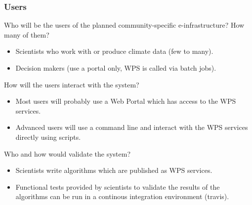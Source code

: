 \documentclass{beamer}
\begin{document}
   \begin{frame}[shrink]
    \frametitle{Users}
    \begin{block}{Who will be the users of the planned community-specific e-infrastructure? How many of them?}
      \begin{itemize}
        \item Scientists who work with or produce climate data (few to many).
        \item Decision makers (use a portal only, WPS is called via batch jobs).
      \end{itemize} 
    \end{block}
    \begin{block}{How will the users interact with the system?} %
      \begin{itemize}
        \item Most users will probably use a Web Portal which has access to the WPS services.
        \item Advanced users will use a command line and interact with the WPS services directly using scripts.
      \end{itemize}
    \end{block}
    \begin{block}{Who and how would validate the system?}
      \begin{itemize}
        \item Scientists write algorithms which are published as WPS services.
        \item Functional tests provided by scientists to validate the results of the algorithms can be run in a continous integration environment (travis).
      \end{itemize}
    \end{block}
  \end{frame}

\end{document}
